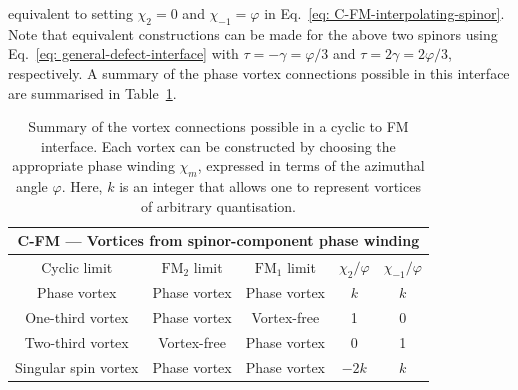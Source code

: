 equivalent to setting \(\chi_2 = 0\) and \(\chi_{-1}=\varphi \) in
Eq.~\eqref{eq: C-FM-interpolating-spinor}.
Note that equivalent constructions can be made for the above two spinors using
Eq.~\eqref{eq: general-defect-interface} with \(\tau=-\gamma=\varphi/3\) and
\(\tau=2\gamma=2\varphi/3\), respectively.
A summary of the phase vortex connections possible in this interface are
summarised in Table~\ref{tab: C-FM-vortices}.
\begin{table}
    \centering
    \begin{tabular}{ccccc}
        \toprule
        \multicolumn{5}{c}{C-FM --- Vortices from spinor-component phase
            winding} \\
        \midrule
        Cyclic limit & \(\text{FM}_2\) limit & \(\text{FM}_1\) limit
            & \(\chi_2/\varphi \) & \(\chi_{-1}/\varphi \) \\
        \midrule
         Phase vortex & Phase vortex & Phase vortex & \(k\) & \(k\) \\ 
         One-third vortex & Phase vortex & Vortex-free & 1 & 0 \\
         Two-third vortex & Vortex-free & Phase vortex & 0 & 1 \\
         Singular spin vortex & Phase vortex & Phase vortex & \(-2k\) & \(k\) \\
        \bottomrule
    \end{tabular}
    \caption[Examples of possible vortex connections across a cyclic to
    ferromagnetic interface]{\label{tab: C-FM-vortices}Summary of the vortex
    connections possible in a cyclic to FM interface.
    Each vortex can be constructed by choosing the appropriate phase winding
    \(\chi_m\), expressed in terms of the azimuthal angle \(\varphi \).
    Here, \(k \) is an integer that allows one to represent vortices of
    arbitrary quantisation.}
\end{table}

